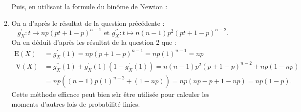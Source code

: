 \documentclass[a4paper, 11pt,reqno]{article}
\begin{document}
\begin{correction}
\begin{enumerate}
\begin{enumerate}
Puis,  en utilisant la formule du binôme de Newton :
\item On a d'après le résultat de la question précédente :
$$
g_{X}^{\prime}: t \mapsto n p(p t+1-p)^{n-1} \text { et } g_{X}^{\prime \prime}: t \mapsto n(n-1) p^{2}(p t+1-p)^{n-2} .
$$
On en déduit d'après les résultat de la question 2 que :
$$
\begin{aligned}
\mathrm{E}(X) &=g_{X}^{\prime}(1)=n p(p+1-p)^{n-1}=n p(1)^{n-1}=n p \\
\mathrm{~V}(X) &=g_{X}^{\prime \prime}(1)+g_{X}^{\prime}(1)\left(1-g_{X}^{\prime}(1)\right)=n(n-1) p^{2}(p+1-p)^{n-2}+n p(1-n p) \\
&=n p\left((n-1) p(1)^{n-2}+(1-n p)\right)=n p(n p-p+1-n p)=n p(1-p) .
\end{aligned}
$$
Cette méthode efficace peut bien sûr être utilisée pour calculer les moments d'autres lois de probabilité finies.

\end{enumerate}
\end{enumerate}





\end{correction}
\end{document}
